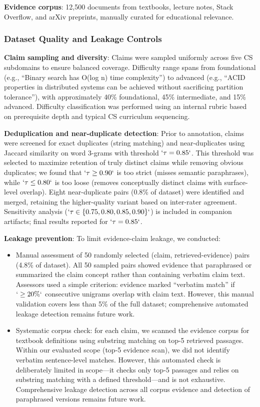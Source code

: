 \textbf{Evidence corpus}: 12,500 documents from textbooks, lecture notes, Stack Overflow, and arXiv preprints, manually curated for educational relevance.

\subsubsection{Dataset Quality and Leakage Controls}\label{dataset-quality-and-leakage-controls}

\textbf{Claim sampling and diversity}: Claims were sampled uniformly across five CS subdomains to ensure balanced coverage. Difficulty range spans from foundational (e.g., ``Binary search has O(log n) time complexity'') to advanced (e.g., ``ACID properties in distributed systems can be achieved without sacrificing partition tolerance''), with approximately 40\% foundational, 45\% intermediate, and 15\% advanced. Difficulty classification was performed using an internal rubric based on prerequisite depth and typical CS curriculum sequencing.

\textbf{Deduplication and near-duplicate detection}: Prior to annotation, claims were screened for exact duplicates (string matching) and near-duplicates using Jaccard similarity on word 3-grams with threshold \(`\tau=0.85`\). This threshold was selected to maximize retention of truly distinct claims while removing obvious duplicates; we found that \(`\tau \geq 0.90`\) is too strict (misses semantic paraphrases), while \(`\tau \leq 0.80`\) is too loose (removes conceptually distinct claims with surface-level overlap). Eight near-duplicate pairs (0.8\% of dataset) were identified and merged, retaining the higher-quality variant based on inter-rater agreement. Sensitivity analysis (\(`\tau \in \{0.75, 0.80, 0.85, 0.90\}`\)) is included in companion artifacts; final results reported for \(`\tau=0.85`\).

\textbf{Leakage prevention}: To limit evidence-claim leakage, we conducted:

\begin{itemize}
\item
  Manual assessment of 50 randomly selected (claim, retrieved-evidence) pairs (4.8\% of dataset). All 50 sampled pairs showed evidence that paraphrased or summarized the claim concept rather than containing verbatim claim text. Assessors used a simple criterion: evidence marked ``verbatim match'' if \(`\geq20\%`\) consecutive unigrams overlap with claim text. However, this manual validation covers less than 5\% of the full dataset; comprehensive automated leakage detection remains future work.
\item
  Systematic corpus check: for each claim, we scanned the evidence corpus for textbook definitions using substring matching on top-5 retrieved passages. Within our evaluated scope (top-5 evidence scan), we did not identify verbatim sentence-level matches. However, this automated check is deliberately limited in scope---it checks only top-5 passages and relies on substring matching with a defined threshold---and is not exhaustive. Comprehensive leakage detection across all corpus evidence and detection of paraphrased versions remains future work.
\end{itemize}

